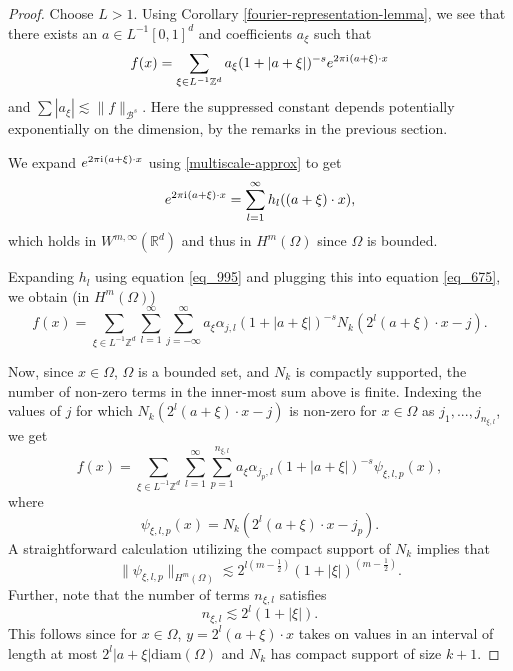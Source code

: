 \begin{proof}
   Choose $L > 1$. Using Corollary \ref{fourier-representation-lemma}, we see that there exists an $a\in L^{-1}[0,1]^d$ and coefficients $a_\xi$ such that
 \begin{equation}\label{eq_675}
  f(x) = \sum_{\xi\in L^{-1}\mathbb{Z}^d} a_\xi (1+|a+\xi|)^{-s}e^{2\pi {\mathrm{i}\mkern1mu}  (a + \xi)\cdot x}
 \end{equation}
 and $\sum |a_\xi|\lesssim \|f\|_{\mathcal{B}^s}$. Here the suppressed constant depends potentially exponentially on the dimension, by the remarks in the previous section.
 
 We expand $e^{2\pi {\mathrm{i}\mkern1mu}   (a+\xi)\cdot x}$ using \eqref{multiscale-approx} to get
 \begin{equation}
  e^{2\pi {\mathrm{i}\mkern1mu}  (a + \xi)\cdot x} = \sum_{l=1}^\infty h_l((a + \xi)\cdot x),
 \end{equation}
 which holds in $W^{m,\infty}(\mathbb{R}^d)$ and thus in $H^m(\Omega)$ since $\Omega$ is bounded. 
 
 Expanding $h_l$ using equation \eqref{eq_995} and plugging this into equation \eqref{eq_675}, we obtain (in $H^m(\Omega)$)
 \begin{equation}
  f(x) = \sum_{\xi\in L^{-1}\mathbb{Z}^d}\sum_{l=1}^\infty \sum_{j=-\infty}^\infty a_\xi \alpha_{j,l} (1+|a+\xi|)^{-s}N_k(2^l(a+\xi)\cdot x - j).
 \end{equation}
 
 Now, since $x\in \Omega$, $\Omega$ is a bounded set, and $N_k$ is compactly supported, the number of non-zero terms in the inner-most sum above is finite. Indexing the values of $j$ for which $N_k(2^l(a+\xi)\cdot x - j)$ is non-zero for $x\in \Omega$ as $j_1,...,j_{n_{\xi, l}}$, we get
 \begin{equation}
  f(x) = \sum_{\xi\in L^{-1}\mathbb{Z}^d}\sum_{l=1}^\infty \sum_{p=1}^{n_{\xi,l}} a_\xi \alpha_{j_p,l} (1+|a+\xi|)^{-s} \psi_{\xi,l,p}(x),
 \end{equation}
 where
 \begin{equation}\label{psi-definition}
  \psi_{\xi,l,p}(x) = N_k(2^l(a+\xi)\cdot x - j_p).
 \end{equation}
 A straightforward calculation utilizing the compact support of $N_k$ implies that
 \begin{equation}\label{eq_454}
  \|\psi_{\xi,l,p}\|_{H^m(\Omega)} \lesssim 2^{l\left(m-\frac{1}{2}\right)}(1 + |\xi|)^{\left(m-\frac{1}{2}\right)}.
 \end{equation}
 Further, note that the number of terms $n_{\xi,l}$ satisfies
 \begin{equation}\label{eq_452}
  n_{\xi,l} \lesssim 2^l(1 + |\xi|).
 \end{equation}
This follows since for $x\in \Omega$, $y = 2^l(a + \xi)\cdot x$ takes on values in an interval of length at most $2^l|a + \xi|\text{diam}(\Omega)$ and $N_k$ has compact support of size $k+1$.


\end{proof}

